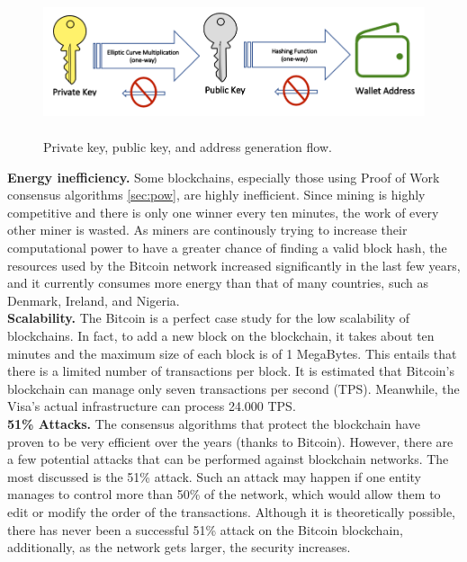 \begin{figure}[h]
    \centering
    \includegraphics[height=4.3cm]{key_generation.png}
    \caption{Private key, public key, and address generation flow.\cite{key}}
    \label{fig:key}
\end{figure}\bigskip
\textbf{Energy inefficiency.}
Some blockchains, especially those using Proof of Work consensus algorithms \ref{sec:pow}, are 
highly inefficient. Since mining is highly competitive and there is 
only one winner every ten minutes, the work of every other miner is wasted.
As miners are continously trying to increase their computational power 
to have a greater chance of finding a valid block hash, the resources used 
by the Bitcoin network increased significantly in the last few years, and it 
currently consumes more energy than that of many countries, such as Denmark, Ireland, 
and Nigeria.\cite{binancevision}\bigskip\\

\textbf{Scalability.}
The Bitcoin is a perfect case study for the low scalability of blockchains.
In fact, to add a new block on the blockchain, it takes about ten minutes and
the maximum size of each block is of 1 MegaBytes. This entails that there is a
limited number of transactions per block. It is estimated that Bitcoin's 
blockchain can manage only seven transactions per second (TPS). Meanwhile, the
Visa's actual infrastructure can process 24.000 TPS.\cite{investopedia}\pagebreak
\\
\textbf{51\% Attacks.}
The consensus algorithms that protect the blockchain have proven to be very 
efficient over the years (thanks to Bitcoin). However, there are a few potential attacks that can 
be performed against blockchain networks. The most discussed is the  51\% attack.
Such an attack may happen if one entity manages to control more than 50\% of the 
network, which would allow them to edit or modify the order of the transactions.
Although it is theoretically possible, there has never been a successful 51\% attack on 
the Bitcoin blockchain, additionally, as the network gets larger, the security 
increases.\cite{binancevision}\smallskip\\ 

